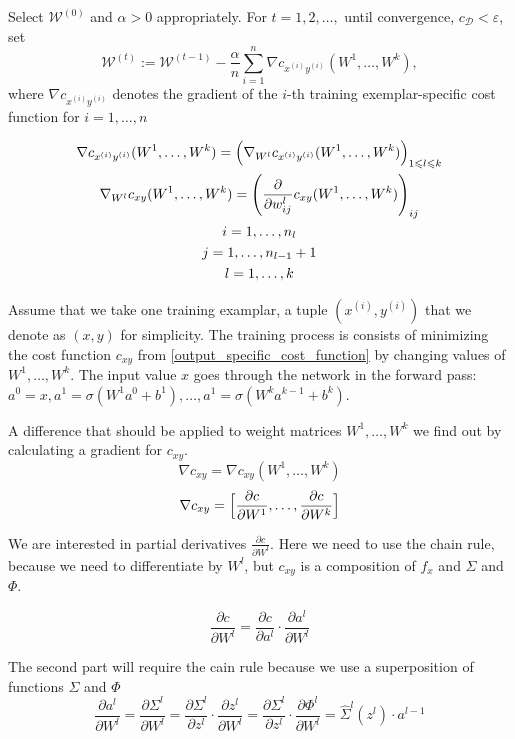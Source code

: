 \documentclass{article}
\begin{document}
Select $\mathcal{W}^{(0)}$ and $\alpha > 0$ appropriately. For $t = 1,2,\dots,$ until convergence, $c_{\mathcal{D}} < \varepsilon$, set
\[
\mathcal{W}^{(t)} := \mathcal{W}^{(t-1)} - \frac{\alpha}{n} \sum_{i=1}^n \nabla c_{x^{(i)}y^{(i)}}(W^1,\dots,W^k),
\]
where $\nabla c_{x^{(i)}y^{(i)}}$ denotes the gradient of the $i$-th training exemplar-specific cost function for $i = 1,\dots,n$

\begin{gather}
\nabla c_{x^{(i)}y^{(i)}}(W^1,\dots,W^k) = \Bigl(\nabla_{W^l} c_{x^{(i)}y^{(i)}}(W^1,\dots,W^k) \Bigr)_{1\leqslant l \leqslant k} \\
\nabla_{W^l} c_{xy}(W^1,\dots,W^k) = \Biggl( \frac{\partial}{\partial w_{ij}^l} c_{xy}(W^1,\dots,W^k) \Biggr)_{ij} \\
i = 1,\dots,n_l \\
j = 1,\dots,n_{l-1} + 1 \\
l = 1,\dots,k
\end{gather}

Assume that we take one training examplar, a tuple $(x^{(i)}, y^{(i)})$ that we denote as $(x,y)$ for simplicity. The training process is consists of minimizing the cost function $c_{xy}$  from \eqref{output_specific_cost_function} by changing values of $W^1,\dots,W^k$. The input value $x$ goes through the network in the forward pass: $a^0 = x, a^1 = \sigma(W^1 a^0 + b^1), \dots, a^1 = \sigma(W^k a^{k-1} + b^k)$.

A difference that should be applied to weight matrices $W^1, \dots, W^k$ we find out by calculating a gradient for $c_{xy}$.
\[
\nabla c_{xy} = \nabla c_{xy}(W^1,\dots,W^k)
\]
\[
\nabla c_{xy} = \Bigl[\frac{\partial c}{\partial W^1}, \dots, \frac{\partial c}{\partial W^k}\Bigr]
\]

We are interested in partial derivatives $\frac{\partial c}{\partial W^l}$. Here we need to use the chain rule, because we need to differentiate by $W^l$, but $c_{xy}$ is a composition of $f_x$ and $\Sigma$ and $\Phi$.

\[
\frac{\partial c}{\partial W^l} = \frac{\partial c}{\partial a^l} \cdot \frac{\partial a^l}{\partial W^l}
\]

The second part will require the cain rule because we use a superposition of functions $\Sigma$ and $\Phi$
\[
\frac{\partial a^l}{\partial W^l} = \frac{\partial \Sigma^l}{\partial W^l} = \frac{\partial \Sigma^l}{\partial z^l} \cdot \frac{\partial z^l}{\partial W^l} = \frac{\partial \Sigma^l}{\partial z^l} \cdot \frac{\partial \Phi^l}{\partial W^l} = \hat\Sigma^l(z^l) \cdot a^{l-1}
\]
\end{document}
